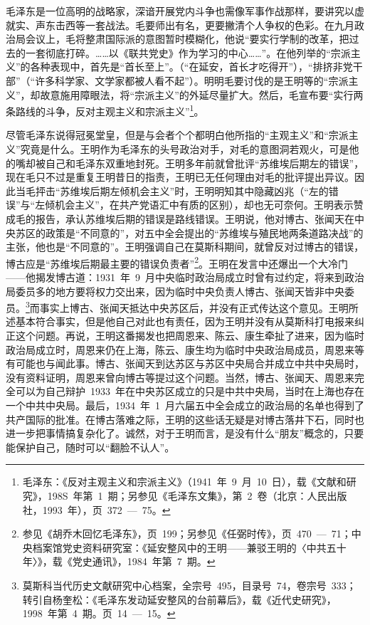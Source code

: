 毛泽东是一位高明的战略家，深谙开展党内斗争也需像军事作战那样，要讲究以虚就实、声东击西等一套战法。毛要师出有名，更要撇清个人争权的色彩。在九月政治局会议上，毛将整肃国际派的意图暂时模糊化，他说“要实行学制的改革，把过去的一套彻底打碎。……以《联共党史》作为学习的中心……”。在他列举的“宗派主义”的各种表现中，首先是“首长至上”。（“在延安，首长才吃得开”），“排挤非党干部”（“许多科学家、文学家都被人看不起”）。明明毛要讨伐的是王明等的“宗派主义”，却故意施用障眼法，将“宗派主义”的外延尽量扩大。然后，毛宣布要“实行两条路线的斗争，反对主观主义和宗派主义”\footnote{毛泽东：《反对主观主义和宗派主义》（1941~年~9~月~10~日），载《文献和研究》，198S~年第~1~期；另参见《毛泽东文集》，第~2~卷（北京：人民出版社，1993~年），页~372~—~75。}。

尽管毛泽东说得冠冕堂皇，但是与会者个个都明白他所指的“主观主义”和“宗派主义”究竟是什么。王明作为毛泽东的头号政治对手，对毛的意图洞若观火，可是他的嘴却被自己和毛泽东双重地封死。王明多年前就曾批评“苏维埃后期左的错误”，现在毛只不过是重复王明昔日的指责，王明已无任何理由对毛的批评提出异议。因此当毛抨击“苏维埃后期左倾机会主义”时，王明明知其中隐藏凶兆（“左的错误”与“左倾机会主义”，在共产党语汇中有质的区别），却也无可奈何。王明表示赞成毛的报告，承认苏维埃后期的错误是路线错误。王明说，他对博古、张闻天在中央苏区的政策是“不同意的”，对五中全会提出的“苏维埃与殖民地两条道路决战”的主张，他也是“不同意的”。王明强调自己在莫斯科期间，就曾反对过博古的错误，博古应是“苏维埃后期最主要的错误负责者”\footnote{参见《胡乔木回忆毛泽东》，页~199；另参见《任弼时传》，页~470~—~71；中央档案馆党史资料研究室：《延安整风中的王明——兼驳王明的〈中共五十年〉》，载《党史通讯》，1984~年第~7~期。}。王明在发言中还爆出一个大冷门——他揭发博古道：1931~年~9~月中央临时政治局成立时曾有过约定，将来到政治局委员多的地方要将权力交出来，因为临时中央负责人博古、张闻天皆非中央委员。\footnote{莫斯科当代历史文献研究中心档案，全宗号~495，目录号~74，卷宗号~333；转引自杨奎松：《毛泽东发动延安整风的台前幕后》，载《近代史研究》，1998~年第~4~期。页~14~—~15。}而事实上博古、张闻天抵达中央苏区后，并没有正式传达这个意见。王明所述基本符合事实，但是他自己对此也有责任，因为王明并没有从莫斯科打电报来纠正这个问题。再说，王明这番揭发也把周恩来、陈云、康生牵扯了进来，因为临时政治局成立时，周恩来仍在上海，陈云、康生均为临时中央政治局成员，周恩来等有可能也与闻此事。博古、张闻天到达苏区与苏区中央局合并成立中共中央局时，没有资料证明，周恩来曾向博古等提过这个问题。当然，博古、张闻天、周恩来完全可以为自己辩护~1933~年在中央苏区成立的只是中共中央局，当时在上海也存在一个中共中央局。最后，1934~年~1~月六届五中全会成立的政治局的名单也得到了共产国际的批准。在博古落难之际，王明的这些话无疑是对博古落井下石，同时也进一步把事情搞复杂化了。诚然，对于王明而言，是没有什么“朋友”概念的，只要能保护自己，随时可以“翻脸不认人”。

